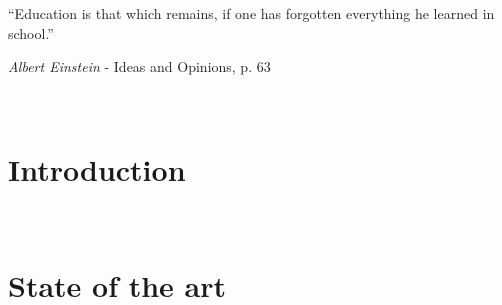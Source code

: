 

\usepackage[
    backend=biber, style=authortitle, defernumbers=true, backref=true, block=none, hyperref=true
]{biblatex}

\setlength{}




\pagestyle{empty}
\newpage \ \newpage


\newpage \ \newpage

\renewcommand{\epigraphsize}{\large}
\renewcommand{\epigraphwidth}{10cm}
\vspace{3cm}
\epigraph{``Education is that which remains, if one has forgotten everything he learned in school.''}{\textit{Albert Einstein} - Ideas and Opinions, p. 63}
\newpage \ \newpage

%


\vspace{-1cm}
\setcounter{tocdepth}{3}
\tableofcontents
\newpage %
\listoffigures
\newpage %
{}
\renewcommand\lstlistlistingname{List of Sample codes/Examples}
\lstlistoflistings

\makeatletter
\@openleftfalse
\makeatother
\pagestyle{fancy}
\part{Introduction}
\label{part:introduction}


\newpage \thispagestyle{empty} \ \newpage
\part{State of the art}
\label{part:state-of-the-art}


